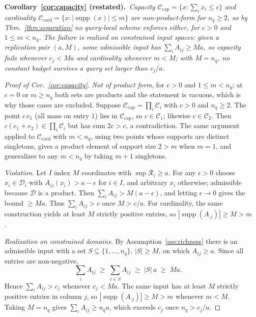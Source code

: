 \documentclass{article}
\newcommand{\supp}{\operatorname{supp}}
\begin{document}
\medskip\noindent\textbf{Corollary~\ref{cor:capacity} (restated).}\ \emph{Capacity $\mathcal{C}_{\mathrm{cap}}=\{x:\sum_i x_i\le c\}$ and cardinality
$\mathcal{C}_{\mathrm{card}}=\{x:|\supp(x)|\le m\}$ are non-product-form for $n_q\ge2$, so by
Thm.~\ref{thm:separation} no query-local scheme enforces either, for $c>0$ and $1\le m<n_q$.
The failure is realized on constrained input spaces: given a replication pair $(a,M)$, some
admissible input has $\sum_i A_{ij}\ge Ma$, so capacity fails whenever $c_j<Ma$ and cardinality
whenever $m<M$; with $M=n_q$, no constant budget survives a query set larger than $c_j/a$.}

\begin{proof}[Proof of Cor.~\ref{cor:capacity}]
\emph{Not of product form}, for $c>0$ and $1\le m<n_q$; at $c=0$ or $m\ge n_q$ both sets are
products and the statement is vacuous, which is why those cases are excluded.
Suppose $\mathcal{C}_{\mathrm{cap}} = \prod_i \mathcal{C}_i$ with
$c > 0$ and $n_q \geq 2$. The point $c\,e_1$ (all mass on entry $1$) lies in
$\mathcal{C}_{\mathrm{cap}}$, so $c \in \mathcal{C}_1$; likewise $c \in \mathcal{C}_2$. Then
$c(e_1 + e_2) \in \prod_i \mathcal{C}_i$ but has sum $2c > c$, a contradiction. The same
argument applied to $\mathcal{C}_{\mathrm{card}}$ with $m < n_q$, using two points whose
supports are distinct singletons, gives a product element of support size $2 > m$ when $m=1$,
and generalizes to any $m < n_q$ by taking $m+1$ singletons.

\emph{Violation.} Let $I$ index $M$ coordinates with $\sup \mathcal{R}_i \geq a$. For any
$\epsilon > 0$ choose $x_i \in \mathcal{D}_i$ with $A_{ij}(x_i) > a - \epsilon$ for
$i \in I$, and arbitrary $x_i$ otherwise; admissible because $\mathcal{D}$ is a product. Then
$\sum_i A_{ij} > M(a-\epsilon)$, and letting $\epsilon \to 0$ gives the bound $\geq Ma$. Thus
$\sum_i A_{ij} > c$ once $M > c/a$. For cardinality, the same construction yields at least $M$
strictly positive entries, so $|\supp(A_{\cdot j})| \geq M > m$.

\emph{Realization on constrained domains.} By Assumption~\ref{ass:richness} there is an admissible input with a set
$S \subseteq \{1,\dots,n_q\}$, $|S| \geq M$, on which $A_{ij} \geq a$. Since all entries are
non-negative,
\begin{equation*}
\sum_i A_{ij} \;\geq\; \sum_{i \in S} A_{ij} \;\geq\; |S|\,a \;\geq\; Ma .
\end{equation*}
Hence $\sum_i A_{ij} > c_j$ whenever $c_j < Ma$. The same input has at least $M$ strictly
positive entries in column $j$, so $|\supp(A_{\cdot j})| \geq M > m$ whenever $m < M$. Taking
$M = n_q$ gives $\sum_i A_{ij} \geq n_q a$, which exceeds $c_j$ once $n_q > c_j/a$.
\end{proof}
\end{document}
